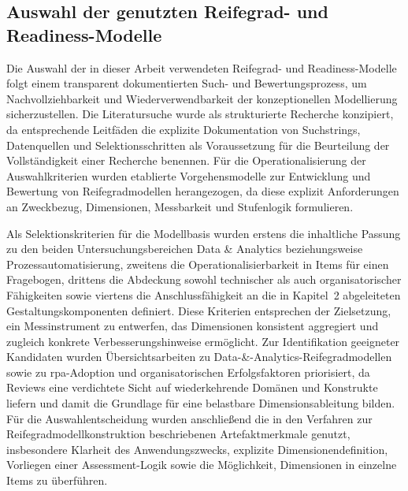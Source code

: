 \subsection{Auswahl der genutzten Reifegrad- und Readiness-Modelle}
\label{subsec:kap3_auswahl_maturity_readiness}

Die Auswahl der in dieser Arbeit verwendeten Reifegrad- und Readiness-Modelle folgt einem transparent dokumentierten Such- und Bewertungsprozess, um Nachvollziehbarkeit und Wiederverwendbarkeit der konzeptionellen Modellierung sicherzustellen.\cite{vomBrocke2009Reconstructing,WebsterWatson2002LiteratureReview,OkoliSchabram2010SLRGuide}
Die Literatursuche wurde als strukturierte Recherche konzipiert, da entsprechende Leitfäden die explizite Dokumentation von Suchstrings, Datenquellen und Selektionsschritten als Voraussetzung für die Beurteilung der Vollständigkeit einer Recherche benennen.\cite{vomBrocke2009Reconstructing,OkoliSchabram2010SLRGuide,KitchenhamCharters2007SLRGuidelines}
Für die Operationalisierung der Auswahlkriterien wurden etablierte Vorgehensmodelle zur Entwicklung und Bewertung von Reifegradmodellen herangezogen, da diese explizit Anforderungen an Zweckbezug, Dimensionen, Messbarkeit und Stufenlogik formulieren.\cite{deBruin2005MainPhases,BeckerKnackstedtPoeppelbuss2009ProcedureModel,PoeppeelbussRoeglinger2011DesignPrinciples}

Als Selektionskriterien für die Modellbasis wurden erstens die inhaltliche Passung zu den beiden Untersuchungsbereichen Data \& Analytics beziehungsweise Prozessautomatisierung, zweitens die Operationalisierbarkeit in Items für einen Fragebogen, drittens die Abdeckung sowohl technischer als auch organisatorischer Fähigkeiten sowie viertens die Anschlussfähigkeit an die in Kapitel~2 abgeleiteten Gestaltungskomponenten definiert.\cite{BeckerKnackstedtPoeppelbuss2009ProcedureModel,PoeppeelbussRoeglinger2011DesignPrinciples,deBruin2005MainPhases}
Diese Kriterien entsprechen der Zielsetzung, ein Messinstrument zu entwerfen, das Dimensionen konsistent aggregiert und zugleich konkrete Verbesserungshinweise ermöglicht.\cite{PoeppeelbussRoeglinger2011DesignPrinciples,BeckerKnackstedtPoeppelbuss2009ProcedureModel}
Zur Identifikation geeigneter Kandidaten wurden Übersichtsarbeiten zu Data-\&-Analytics-Reifegradmodellen sowie zu \gls{rpa}-Adoption und organisatorischen Erfolgsfaktoren priorisiert, da Reviews eine verdichtete Sicht auf wiederkehrende Domänen und Konstrukte liefern und damit die Grundlage für eine belastbare Dimensionsableitung bilden.\cite{Langer2025DataAnalyticsMaturityReview,ChuahWong2011BIMaturityReview,daSilvaCostaMamedeSilva2022RPAAdoptionSLR}
Für die Auswahlentscheidung wurden anschließend die in den Verfahren zur Reifegradmodellkonstruktion beschriebenen Artefaktmerkmale genutzt, insbesondere Klarheit des Anwendungszwecks, explizite Dimensionendefinition, Vorliegen einer Assessment-Logik sowie die Möglichkeit, Dimensionen in einzelne Items zu überführen.\cite{deBruin2005MainPhases,BeckerKnackstedtPoeppelbuss2009ProcedureModel,PoeppeelbussRoeglinger2011DesignPrinciples}

